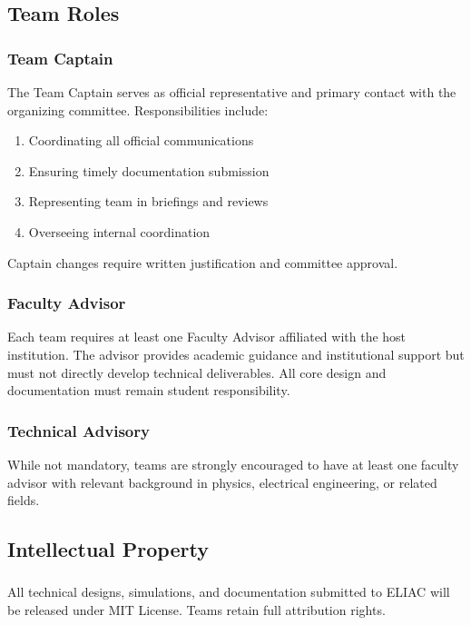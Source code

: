 \subsection{Team Roles}

\subsubsection{Team Captain}
The Team Captain serves as official representative and primary contact with the organizing committee. Responsibilities include:
\begin{enumerate}[noitemsep]
    \item Coordinating all official communications
    \item Ensuring timely documentation submission
    \item Representing team in briefings and reviews
    \item Overseeing internal coordination
\end{enumerate}

Captain changes require written justification and committee approval.

\subsubsection{Faculty Advisor}
Each team requires at least one Faculty Advisor affiliated with the host institution. The advisor provides academic guidance and institutional support but must not directly develop technical deliverables. All core design and documentation must remain student responsibility.

\subsubsection{Technical Advisory}
While not mandatory, teams are strongly encouraged to have at least one faculty advisor with relevant background in physics, electrical engineering, or related fields.

\subsection{Intellectual Property}

\subsubsection{}
All technical designs, simulations, and documentation submitted to ELIAC will be released under MIT License. Teams retain full attribution rights.

